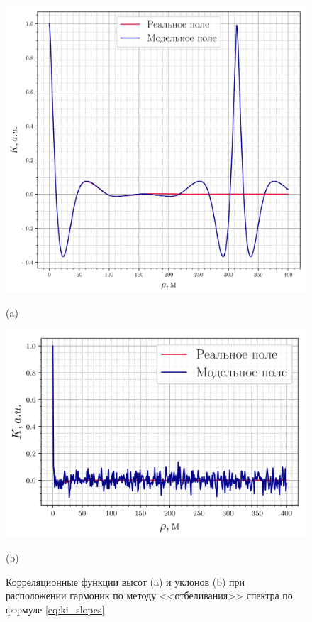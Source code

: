\documentclass[a4paper,14pt]{extarticle}
\begin{document}
\begin{figure}[ht]
    \centering
    \begin{minipage}{0.49\linewidth}
        \centering
        \includegraphics[width=\linewidth]{fig/correlation_height5_slopes2.png}

        (a)
    \end{minipage}
    \begin{minipage}{0.49\linewidth}
        \centering
        \includegraphics[width=\linewidth]{fig/correlation_angles_slopes2.png}

        (b)


    \end{minipage}
    \caption{ Корреляционные функции высот (a) и уклонов (b) при расположении гармоник
    по методу <<отбеливания>> спектра по формуле \eqref{eq:ki_slopes} }
    \label{fig:ki_slopes}
\end{figure}
\end{document}
